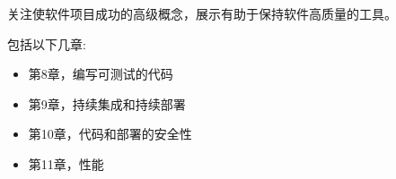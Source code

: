 
关注使软件项目成功的高级概念，展示有助于保持软件高质量的工具。

包括以下几章:

\begin{itemize}
\item 第8章，编写可测试的代码
\item 第9章，持续集成和持续部署
\item 第10章，代码和部署的安全性
\item 第11章，性能 
\end{itemize}